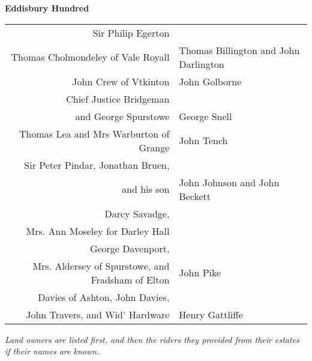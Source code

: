 \pagebreak

\vspace*{30mm}

\begin{center}
  \Large
  \textbf{Eddisbury Hundred}
\end{center}

\begin{center}
  \small
  \begin{tabular}{rl}
    Sir Philip Egerton & \dotfill \\
    Thomas Cholmondeley of Vale Royall & Thomas Billington and John Darlington \\
    John Crew of Vtkinton & John Golborne \\
    Chief Justice Bridgeman \\ and George Spurstowe & George Snell \\
    Thomas Lea and Mrs Warburton of Grange & John Tench \\
    Sir Peter Pindar, Jonathan Bruen, \\ and his son & John Johnson and John Beckett \\
    Darcy Savadge, \\ Mrs. Ann Moseley for Darley Hall & \dotfill \\
    George Davenport, \\ Mrs. Aldersey of Spurstowe, and Fradsham of Elton & John Pike \\
    Davies of Ashton, John Davies, \\ John Travers, and Wid' Hardware & Henry Gattliffe \\
  \end{tabular}
\end{center}

\vfill

\begin{center}
  \noindent
  \it
  \small
  Land owners are listed first, and then the riders they provided from their estates if their names are known.
\end{center}
